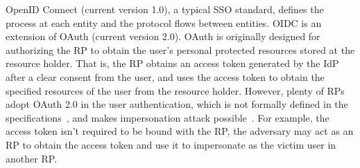 OpenID Connect (current version 1.0), a typical SSO standard,  defines the process at each entity and the protocol flows between entities. OIDC is  an extension of OAuth (current version 2.0). OAuth is originally designed for authorizing the RP to obtain the user's personal protected resources stored at the resource holder. That is, the RP obtains an access token generated by the IdP after a clear consent from the user, and  uses the access token to obtain the specified resources of the user from the resource holder. However, plenty of RPs adopt OAuth 2.0 in the user authentication, which is not formally defined in the specifications~\cite{rfc6749,rfc6750}, and makes impersonation attack possible~\cite{ChenPCTKT14, WangZLG16}. For example, the access token isn't required to be bound with the RP, the adversary may act as an RP to obtain the access token and use it to impersonate as the victim user in another RP.



